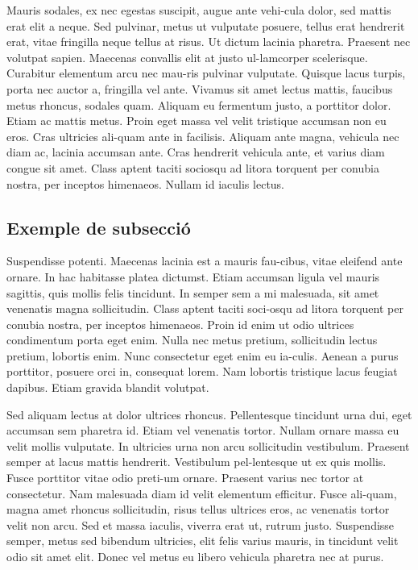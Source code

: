 ﻿\documentclass[10pt,a4paper,twocolumn,twoside]{article}
\begin{document}
Mauris sodales, ex nec egestas suscipit, augue ante vehi-cula dolor, sed mattis erat elit a neque. Sed pulvinar, metus ut vulputate posuere, tellus erat hendrerit erat, vitae fringilla neque tellus at risus. Ut dictum lacinia pharetra. Praesent nec volutpat sapien. Maecenas convallis elit at justo ul-lamcorper scelerisque. Curabitur elementum arcu nec mau-ris pulvinar vulputate. Quisque lacus turpis, porta nec auctor a, fringilla vel ante. Vivamus sit amet lectus mattis, faucibus metus rhoncus, sodales quam. Aliquam eu fermentum justo, a porttitor dolor. Etiam ac mattis metus. Proin eget massa vel velit tristique accumsan non eu eros. Cras ultricies ali-quam ante in facilisis. Aliquam ante magna, vehicula nec diam ac, lacinia accumsan ante. Cras hendrerit vehicula ante, et varius diam congue sit amet. Class aptent taciti sociosqu ad litora torquent per conubia nostra, per inceptos himenaeos. Nullam id iaculis lectus. 


\subsection{Exemple de subsecció}

Suspendisse potenti. Maecenas lacinia est a mauris fau-cibus, vitae eleifend ante ornare. In hac habitasse platea dictumst. Etiam accumsan ligula vel mauris sagittis, quis mollis felis tincidunt. In semper sem a mi malesuada, sit amet venenatis magna sollicitudin. Class aptent taciti soci-osqu ad litora torquent per conubia nostra, per inceptos himenaeos. Proin id enim ut odio ultrices condimentum porta eget enim. Nulla nec metus pretium, sollicitudin lectus pretium, lobortis enim. Nunc consectetur eget enim eu ia-culis. Aenean a purus porttitor, posuere orci in, consequat lorem. Nam lobortis tristique lacus feugiat dapibus. Etiam gravida blandit volutpat. 

Sed aliquam lectus at dolor ultrices rhoncus. Pellentesque tincidunt urna dui, eget accumsan sem pharetra id. Etiam vel venenatis tortor. Nullam ornare massa eu velit mollis vulputate. In ultricies urna non arcu sollicitudin vestibulum. Praesent semper at lacus mattis hendrerit. Vestibulum pel-lentesque ut ex quis mollis. Fusce porttitor vitae odio preti-um ornare. Praesent varius nec tortor at consectetur. Nam malesuada diam id velit elementum efficitur. Fusce ali-quam, magna amet rhoncus sollicitudin, risus tellus ultrices eros, ac venenatis tortor velit non arcu. Sed et massa iaculis, viverra erat ut, rutrum justo. Suspendisse semper, metus sed bibendum ultricies, elit felis varius mauris, in tincidunt velit odio sit amet elit. Donec vel metus eu libero vehicula pharetra nec at purus. 
\end{document}
